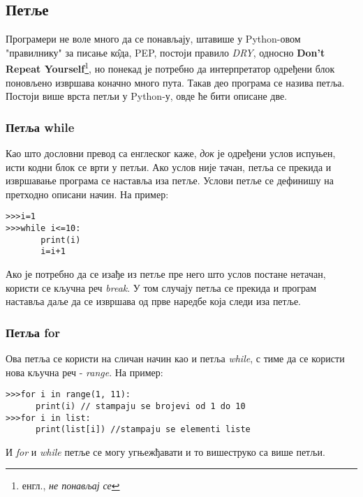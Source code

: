 \subsection{Петље}

Програмери не воле много да се понављају, штавише у Python-овом "правилнику" за писање к\^{о}да, PEP\cite{PEP}, постоји правило \emph{DRY}, односно \textbf{Don't Repeat Yourself}\footnote{енгл., \emph{не понављај се}}, но понекад је потребно да интерпретатор одређени блок поновљено извршава коначно много пута. Такав део програма се назива петља. Постоји више врста петљи у Python-у, овде ће бити описане две.

\subsubsection{Петља while}

Као што дословни превод са енглеског каже, \emph{док} је одређени услов испуњен, исти кодни блок се врти у петљи. Ако услов није тачан, петља се прекида и извршавање програма се наставља иза петље. Услови петље се дефинишу на претходно описани начин. На пример:

\begin{lstlisting}[caption = Пример while петље, label = while]
>>>i=1
>>>while i<=10:
       print(i)
       i=i+1
\end{lstlisting}

Ако је потребно да се изађе из петље пре него што услов постане нетачан, користи се кључна реч \emph{break}. У том случају петља се прекида и програм наставља даље да се извршава од прве наредбе која следи иза петље.

\subsubsection{Петља for}
Ова петља се користи на сличан начин као и петља \emph{while}, с тиме да се користи нова кључна реч - \emph{range}. На пример:

\begin{lstlisting}[caption = Примери \emph{for} петље, label = for]
>>>for i in range(1, 11):
      print(i) // stampaju se brojevi od 1 do 10
>>>for i in list:
      print(list[i]) //stampaju se elementi liste
\end{lstlisting}

И \emph{for} и \emph{while} петље се могу угњежђавати и то вишеструко са више петљи.
